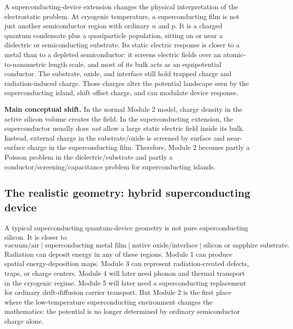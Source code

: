 \documentclass[11pt]{article}
\begin{document}
A superconducting-device extension changes the physical interpretation of the electrostatic problem. At cryogenic temperature, a superconducting film is not just another semiconductor region with ordinary $n$ and $p$. It is a charged quantum condensate plus a quasiparticle population, sitting on or near a dielectric or semiconducting substrate. Its static electric response is closer to a metal than to a depleted semiconductor: it screens electric fields over an atomic-to-nanometric length scale, and most of its bulk acts as an equipotential conductor. The substrate, oxide, and interface still hold trapped charge and radiation-induced charge. Those charges alter the potential landscape seen by the superconducting island, shift offset charge, and can modulate device response.

\begin{physicsbox}
\textbf{Main conceptual shift.} In the normal Module 2 model, charge density in the active silicon volume creates the field. In the superconducting extension, the superconductor usually does \emph{not} allow a large static electric field inside its bulk. Instead, external charge in the substrate/oxide is screened by surface and near-surface charge in the superconducting film. Therefore, Module 2 becomes partly a Poisson problem in the dielectric/substrate and partly a conductor/screening/capacitance problem for superconducting islands.
\end{physicsbox}

\subsection{The realistic geometry: hybrid superconducting device}

A typical superconducting quantum-device geometry is not pure superconducting silicon. It is closer to
\begin{equation}
\text{vacuum/air} \; | \; \text{superconducting metal film} \; | \; \text{native oxide/interface} \; | \; \text{silicon or sapphire substrate}.
\end{equation}
Radiation can deposit energy in any of these regions. Module 1 can produce spatial energy-deposition maps. Module 3 can represent radiation-created defects, traps, or charge centers. Module 4 will later need phonon and thermal transport in the cryogenic regime. Module 5 will later need a superconducting replacement for ordinary drift-diffusion carrier transport. But Module 2 is the first place where the low-temperature superconducting environment changes the mathematics: the potential is no longer determined by ordinary semiconductor charge alone.
\end{document}
